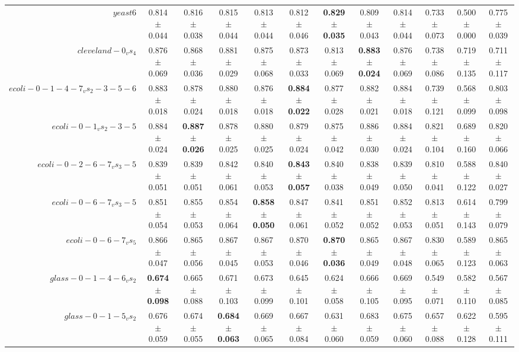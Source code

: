 \begin{table}[!ht]
{\begin{tabular}{r c c c c c c c c c c c}
$yeast6$ & 0.814 $\pm$ 0.044 & 0.816 $\pm$ 0.038 & 0.815 $\pm$ 0.044 & 0.813 $\pm$ 0.044 & 0.812 $\pm$ 0.046 & \textbf{0.829 $\pm$ 0.035} & 0.809 $\pm$ 0.043 & 0.814 $\pm$ 0.044 & 0.733 $\pm$ 0.073 & 0.500 $\pm$ 0.000 & 0.775 $\pm$ 0.039 \\
$cleveland-0_vs_4$ & 0.876 $\pm$ 0.069 & 0.868 $\pm$ 0.036 & 0.881 $\pm$ 0.029 & 0.875 $\pm$ 0.068 & 0.873 $\pm$ 0.033 & 0.813 $\pm$ 0.069 & \textbf{0.883 $\pm$ 0.024} & 0.876 $\pm$ 0.069 & 0.738 $\pm$ 0.086 & 0.719 $\pm$ 0.135 & 0.711 $\pm$ 0.117 \\
$ecoli-0-1-4-7_vs_2-3-5-6$ & 0.883 $\pm$ 0.018 & 0.878 $\pm$ 0.024 & 0.880 $\pm$ 0.018 & 0.876 $\pm$ 0.018 & \textbf{0.884 $\pm$ 0.022} & 0.877 $\pm$ 0.028 & 0.882 $\pm$ 0.021 & 0.884 $\pm$ 0.018 & 0.739 $\pm$ 0.121 & 0.568 $\pm$ 0.099 & 0.803 $\pm$ 0.098 \\
$ecoli-0-1_vs_2-3-5$ & 0.884 $\pm$ 0.024 & \textbf{0.887 $\pm$ 0.026} & 0.878 $\pm$ 0.025 & 0.880 $\pm$ 0.025 & 0.879 $\pm$ 0.024 & 0.875 $\pm$ 0.042 & 0.886 $\pm$ 0.030 & 0.884 $\pm$ 0.024 & 0.821 $\pm$ 0.104 & 0.689 $\pm$ 0.160 & 0.820 $\pm$ 0.066 \\
$ecoli-0-2-6-7_vs_3-5$ & 0.839 $\pm$ 0.051 & 0.839 $\pm$ 0.051 & 0.842 $\pm$ 0.061 & 0.840 $\pm$ 0.053 & \textbf{0.843 $\pm$ 0.057} & 0.840 $\pm$ 0.038 & 0.838 $\pm$ 0.049 & 0.839 $\pm$ 0.050 & 0.810 $\pm$ 0.041 & 0.588 $\pm$ 0.122 & 0.840 $\pm$ 0.027 \\
$ecoli-0-6-7_vs_3-5$ & 0.851 $\pm$ 0.054 & 0.855 $\pm$ 0.053 & 0.854 $\pm$ 0.064 & \textbf{0.858 $\pm$ 0.050} & 0.847 $\pm$ 0.061 & 0.841 $\pm$ 0.052 & 0.851 $\pm$ 0.052 & 0.852 $\pm$ 0.053 & 0.813 $\pm$ 0.051 & 0.614 $\pm$ 0.143 & 0.799 $\pm$ 0.079 \\
$ecoli-0-6-7_vs_5$ & 0.866 $\pm$ 0.047 & 0.865 $\pm$ 0.056 & 0.867 $\pm$ 0.045 & 0.867 $\pm$ 0.053 & 0.870 $\pm$ 0.046 & \textbf{0.870 $\pm$ 0.036} & 0.865 $\pm$ 0.049 & 0.867 $\pm$ 0.048 & 0.830 $\pm$ 0.065 & 0.589 $\pm$ 0.123 & 0.865 $\pm$ 0.063 \\
$glass-0-1-4-6_vs_2$ & \textbf{0.674 $\pm$ 0.098} & 0.665 $\pm$ 0.088 & 0.671 $\pm$ 0.103 & 0.673 $\pm$ 0.099 & 0.645 $\pm$ 0.101 & 0.624 $\pm$ 0.058 & 0.666 $\pm$ 0.105 & 0.669 $\pm$ 0.095 & 0.549 $\pm$ 0.071 & 0.582 $\pm$ 0.110 & 0.567 $\pm$ 0.085 \\
$glass-0-1-5_vs_2$ & 0.676 $\pm$ 0.059 & 0.674 $\pm$ 0.055 & \textbf{0.684 $\pm$ 0.063} & 0.669 $\pm$ 0.065 & 0.667 $\pm$ 0.084 & 0.631 $\pm$ 0.060 & 0.683 $\pm$ 0.059 & 0.675 $\pm$ 0.060 & 0.657 $\pm$ 0.088 & 0.622 $\pm$ 0.128 & 0.595 $\pm$ 0.111 \\

\end{tabular}}
\end{table}

